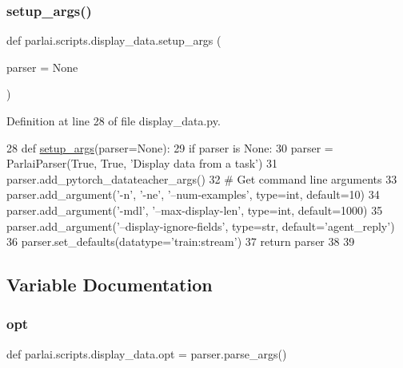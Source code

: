 \subsubsection{\texorpdfstring{setup\+\_\+args()}{setup\_args()}}
{\footnotesize\ttfamily def parlai.\+scripts.\+display\+\_\+data.\+setup\+\_\+args (\begin{DoxyParamCaption}\item[{}]{parser = {\ttfamily None} }\end{DoxyParamCaption})}



Definition at line 28 of file display\+\_\+data.\+py.


\begin{DoxyCode}
28 \textcolor{keyword}{def }\hyperlink{namespaceparlai_1_1scripts_1_1display__data_a666e6177939b9a63961e56a1dfdc74b4}{setup\_args}(parser=None):
29     \textcolor{keywordflow}{if} parser \textcolor{keywordflow}{is} \textcolor{keywordtype}{None}:
30         parser = ParlaiParser(\textcolor{keyword}{True}, \textcolor{keyword}{True}, \textcolor{stringliteral}{'Display data from a task'})
31     parser.add\_pytorch\_datateacher\_args()
32     \textcolor{comment}{# Get command line arguments}
33     parser.add\_argument(\textcolor{stringliteral}{'-n'}, \textcolor{stringliteral}{'-ne'}, \textcolor{stringliteral}{'--num-examples'}, type=int, default=10)
34     parser.add\_argument(\textcolor{stringliteral}{'-mdl'}, \textcolor{stringliteral}{'--max-display-len'}, type=int, default=1000)
35     parser.add\_argument(\textcolor{stringliteral}{'--display-ignore-fields'}, type=str, default=\textcolor{stringliteral}{'agent\_reply'})
36     parser.set\_defaults(datatype=\textcolor{stringliteral}{'train:stream'})
37     \textcolor{keywordflow}{return} parser
38 
39 
\end{DoxyCode}


\subsection{Variable Documentation}
\mbox{\label{namespaceparlai_1_1scripts_1_1display__data_ae32a1a88bf398939e558e8eb7d1cb94e}} 
\subsubsection{\texorpdfstring{opt}{opt}}
{\footnotesize\ttfamily def parlai.\+scripts.\+display\+\_\+data.\+opt = parser.\+parse\+\_\+args()}



